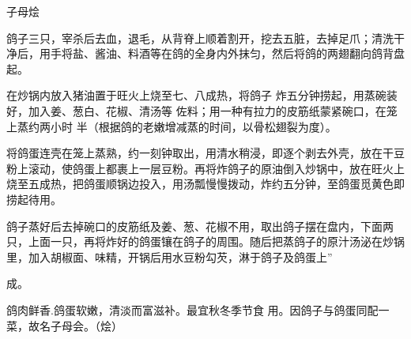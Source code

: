 \begin{recipe}{子母烩}

\ingredients


\cooking

\step 鸽子三只，宰杀后去血，退毛，从背脊上顺着割开，挖去五脏，去掉足爪；清洗干净后，用手将盐、酱油、料酒等在鸽的全身内外抹匀，然后将鸽的两翅翻向鸽背盘起。

在炒锅内放入猪油置于旺火上烧至七、八成热，将鸽子 炸五分钟捞起，用蒸碗装好，加入姜、葱白、花椒、清汤等 佐料；用一种有拉力的皮筋纸蒙紧碗口，在笼上蒸约两小时 半（根据鸽的老嫩增减蒸的时间，以骨松翅裂为度）。

\step 将鸽蛋连壳在笼上蒸熟，约一刻钟取出，用清水稍浸，即逐个剥去外壳，放在干豆粉上滚动，使鸽蛋上都裹上一层豆粉。再将炸鸽子的原油倒入炒锅中，放在旺火上烧至五成热，把鸽蛋顺锅边投入，用汤瓢慢慢拨动，炸约五分钟，至鸽蛋觅黄色即捞起待用。

\step 鸽子蒸好后去掉碗口的皮筋纸及姜、葱、花椒不用，取出鸽子摆在盘内，下面两只，上面一只，再将炸好的鸽蛋镶在鸽子的周围。随后把蒸鸽子的原汁汤泌在炒锅里，加入胡椒面、味精，开锅后用水豆粉勾芡，淋于鸽子及鸽蛋上”

成。

\notes

鸽肉鲜香.鸽蛋软嫩，清淡而富滋补。最宜秋冬季节食 用。因鸽子与鸽蛋同配一菜，故名子母会。（烩）

\end{recipe}

